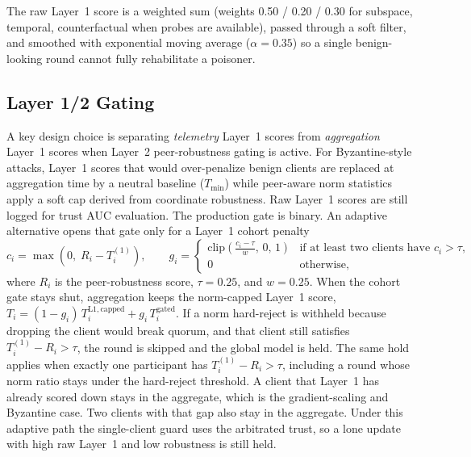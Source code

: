 The raw Layer~1 score is a weighted sum (weights 0.50 / 0.20 / 0.30 for subspace, temporal, counterfactual when probes are available), passed through a soft filter, and smoothed with exponential moving average ($\alpha{=}0.35$) so a single benign-looking round cannot fully rehabilitate a poisoner.

\subsection{Layer 1/2 Gating}
\label{sec:method-gating}

A key design choice is separating \emph{telemetry} Layer~1 scores from \emph{aggregation} Layer~1 scores when Layer~2 peer-robustness gating is active.
For Byzantine-style attacks, Layer~1 scores that would over-penalize benign clients are replaced at aggregation time by a neutral baseline ($T_{\min}$) while peer-aware norm statistics apply a soft cap derived from coordinate robustness.
Raw Layer~1 scores are still logged for trust AUC evaluation.
The production gate is binary.
An adaptive alternative opens that gate only for a Layer~1 cohort penalty
\begin{equation}
  c_i = \max\!\left(0,\; R_i - T_i^{(1)}\right),
  \qquad
  g_i =
  \begin{cases}
    \mathrm{clip}\!\left(\frac{c_i - \tau}{w},\, 0,\, 1\right)
      & \text{if at least two clients have } c_i > \tau, \\
    0 & \text{otherwise,}
  \end{cases}
  \label{eq:adaptive-gate}
\end{equation}
where \(R_i\) is the peer-robustness score, \(\tau{=}0.25\), and \(w{=}0.25\).
When the cohort gate stays shut, aggregation keeps the norm-capped Layer~1 score,
\(T_i = (1-g_i)\,T_i^{\mathrm{L1,capped}} + g_i\,T_i^{\mathrm{gated}}\).
If a norm hard-reject is withheld because dropping the client would break quorum, and that client still satisfies \(T_i^{(1)} - R_i > \tau\), the round is skipped and the global model is held.
The same hold applies when exactly one participant has \(T_i^{(1)} - R_i > \tau\), including a round whose norm ratio stays under the hard-reject threshold.
A client that Layer~1 has already scored down stays in the aggregate, which is the gradient-scaling and Byzantine case. Two clients with that gap also stay in the aggregate.
Under this adaptive path the single-client guard uses the arbitrated trust, so a lone update with high raw Layer~1 and low robustness is still held.
